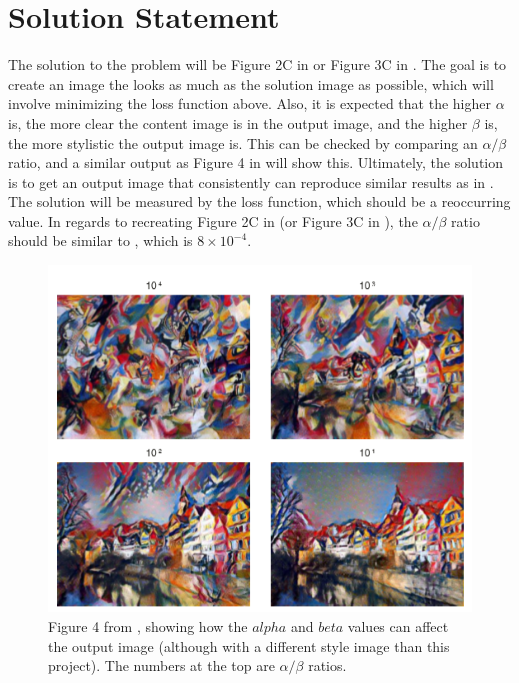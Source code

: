 \documentclass[9pt]{article}
\begin{document}
\section{Solution Statement}
The solution to the problem will be Figure 2C in \cite{Neural} or Figure 3C in \cite{Image}. The goal is to create an image the looks as much as the solution image as possible, which will involve minimizing the loss function above. Also, it is expected that the higher $\alpha$ is, the more clear the content image is in the output image, and the higher $\beta$ is, the more stylistic the output image is. This can be checked by comparing an $\alpha/\beta$ ratio, and a similar output as Figure 4 in \cite{Image} will show this. Ultimately, the solution is to get an output image that consistently can reproduce similar results as in \cite{Neural, Image}. The solution will be measured by the loss function, which should be a reoccurring value. In regards to recreating Figure 2C in \cite{Neural} (or Figure 3C in \cite{Image}), the $\alpha/\beta$ ratio should be similar to \cite{Image}, which is $8 \times 10^{-4}$.

\begin{figure}[H]
\centering
        \includegraphics[totalheight=8cm]{Figure4AlphaBetaRatios.png}
    \caption{Figure 4 from \cite{Image}, showing how the $alpha$ and $beta$ values can affect the output image (although with a different style image than this project). The numbers at the top are $\alpha/\beta$ ratios.}
    \label{fig:solution}
\end{figure}
\end{document}
